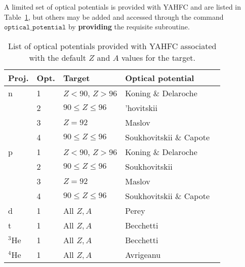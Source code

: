 \documentclass[
10pt,
showpacs,preprintnumbers,footinbib,
amsfonts,amsmath,amssymb,
aps,
prc,twocolumn,groupedaddress,superscriptaddress,
showkeys,
nofootinbib
]{revtex4-1}
\begin{document}
A limited set of optical potentials is provided with YAHFC and are listed in Table~\ref{tab:optical}, but others may be added and accessed through the command ${\texttt{optical\_potential}}$ by {\bf providing} the requisite subroutine. 

\begin{table}
\caption{List of optical potentials provided with YAHFC associated with the default $Z$ and $A$ values for the target.}
\begin{tabular}{| p{0.75cm} | p{0.75cm} | p{2.2cm} | p{4cm}|}
\hline
Proj. & Opt. & Target & Optical potential \\
\hline\hline
n & 1 & $ Z < 90 $, $Z >96$ & Koning \& Delaroche~\cite{Koning:2003}\\
  &  2 & $90 \le Z \le 96$   & 'hovitskii~\cite{Soukhovitskii:2004} \\
  & 3 &  $Z = 92$   &  Maslov ~\cite{Maslov:2003} \\
  & 4 &  $90 \le Z \le 96$   & Soukhovitskii \& Capote   ~\cite{Soukhovitskii:2016,Soukhovitskii:2020} \\ 
\hline
p & 1 & $ Z < 90 $, $Z >96$&  Koning \& Delaroche~\cite{Koning:2003}\\
  &  2 & $90 \le Z \le 96$& Soukhovitskii~\cite{Soukhovitskii:2004} \\
  & 3 &  $Z = 92$   &  Maslov ~\cite{Maslov:2003} \\
  & 4 &  $90 \le Z \le 96$   & Soukhovitskii \& Capote  ~\cite{Soukhovitskii:2016,Soukhovitskii:2020} \\ 
 \hline
d & 1 & All $Z,A$  &  Perey~\cite{Perey:1976}\\
\hline
t & 1 & All $Z,A$ & Becchetti~\cite{Perey:1976}\\
\hline
$^3$He & 1 & All $Z,A$  & Becchetti~\cite{Perey:1976}\\
\hline
$^4$He & 1 & All $Z,A$  & Avrigeanu~\cite{Avrigeanu:1994}\\
\hline
\end{tabular}
\label{tab:optical}
\end{table}
\end{document}
